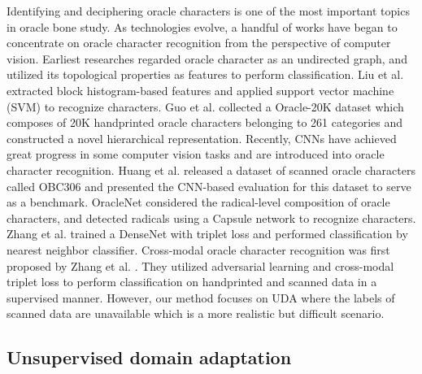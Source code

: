 \documentclass[10pt,journal,compsoc,twocolumn ]{IEEEtran}
\begin{document}
Identifying and deciphering oracle characters is one of the most important topics in oracle bone study. As technologies evolve, a handful of works have began to concentrate on oracle character recognition from the perspective of computer vision. Earliest researches \cite{zhou1995method,li2000coding,li2011recognition,shaotong2016identification} regarded oracle character as an undirected graph, and utilized its topological properties as features to  perform classification. %
Liu et al. \cite{liu2017oracle} extracted block histogram-based features and applied support vector machine (SVM) to recognize characters. Guo et al. \cite{guo2015building} collected a Oracle-20K dataset which composes of 20K handprinted oracle characters belonging to 261 categories and constructed a novel hierarchical representation. Recently, CNNs have achieved great progress in some computer vision tasks and are introduced into oracle character recognition. Huang et al. \cite{huang2019obc306} released a dataset of scanned oracle characters called OBC306 and presented the CNN-based evaluation for this dataset to serve as a benchmark. OracleNet \cite{lu2020recognition} considered the radical-level composition of oracle characters, and detected radicals using a Capsule network \cite{sabour2017dynamic} to recognize characters. Zhang et al. \cite{zhang2019oracle} trained a DenseNet \cite{huang2017densely} with triplet loss and performed classification by nearest neighbor classifier. Cross-modal oracle character recognition was first proposed by Zhang et al. \cite{zhang2021oracle}. They utilized adversarial learning and cross-modal triplet loss to perform classification on handprinted and scanned data in a supervised manner. However, our method focuses on UDA where the labels of scanned data are unavailable which is a more realistic but difficult scenario.

\subsection{Unsupervised domain adaptation}
\end{document}
